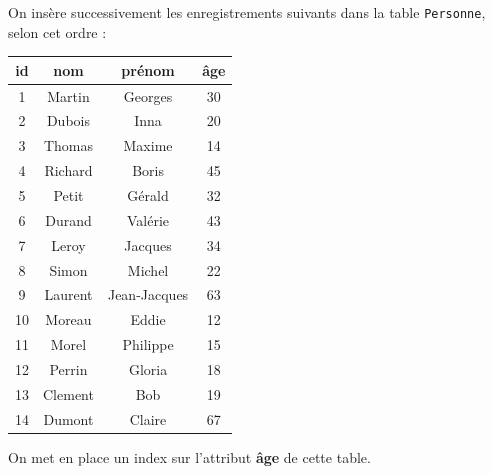 On insère successivement les enregistrements suivants dans la table 
\texttt{Personne}, selon cet ordre :

\begin{center}
\begin{small}
\begin{tabular}{c|c|c|c}
\textbf{id} & \textbf{nom} & \textbf{prénom} & \textbf{âge} \\
\hline
\hline
1 & Martin & Georges & 30\\
\hline
2 & Dubois & Inna & 20 \\
\hline
3 & Thomas & Maxime & 14\\
\hline
4 & Richard & Boris & 45\\
\hline
5 & Petit & Gérald & 32\\
\hline
6 & Durand & Valérie & 43\\
\hline
7 & Leroy & Jacques & 34 \\
\hline
8 & Simon & Michel & 22 \\
\hline
9 & Laurent & Jean-Jacques & 63\\
\hline
10 & Moreau & Eddie & 12\\
\hline
11 & Morel & Philippe & 15\\
\hline
12 & Perrin & Gloria & 18 \\
\hline
13 & Clement & Bob & 19\\
\hline
14 & Dumont  &  Claire & 67\\
\hline
\end{tabular}
\end{small}
\end{center}

On met en place un index sur l'attribut \textbf{âge} de cette table. 

